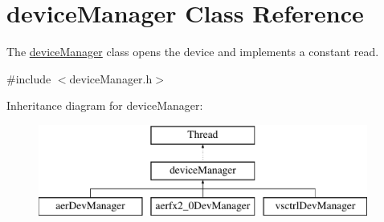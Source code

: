 \hypertarget{classdeviceManager}{\section{device\-Manager Class Reference}
\label{classdeviceManager}
}


The \hyperlink{classdeviceManager}{device\-Manager} class opens the device and implements a constant read.  




{\ttfamily \#include $<$device\-Manager.\-h$>$}

Inheritance diagram for device\-Manager\-:\begin{figure}[H]
\begin{center}
\leavevmode
\includegraphics[height=3.000000cm]{classdeviceManager}
\end{center}
\end{figure}
